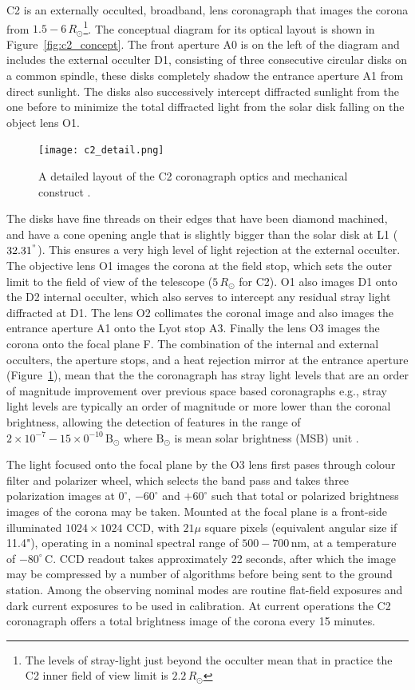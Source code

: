 C2 is an externally occulted, broadband, lens coronagraph that images the corona from $1.5-6\,R_{\odot}$\footnote{The levels of stray-light just beyond the occulter mean that in practice the C2 inner field of view limit is $2.2\,R_{\odot}$}. The conceptual diagram for its optical layout is shown in Figure~\ref{fig:c2_concept}. The front aperture A0 is on the left of the diagram and includes the external occulter D1, consisting of three consecutive circular disks on a common spindle, these disks completely shadow the entrance aperture A1 from direct sunlight. The disks also successively intercept diffracted sunlight from the one before to minimize the total diffracted light from the solar disk falling on the object lens O1. 
\begin{figure}[!t]
\begin{center}
\texttt{[image: c2\_detail.png]}
\caption[The LASCO C2 coronagraph detail]{A detailed layout of the C2 coronagraph optics and mechanical construct \citep{bru95}.}
\label{fig:c2_detail}
\end{center}
\end{figure}
The disks have fine threads on their edges that have been diamond machined, and have a cone opening angle that is slightly bigger than the solar disk at L1 ($32.31^"$). This ensures a very high level of light rejection at the external occulter. The objective lens O1 images the corona at the field stop, which sets the outer limit to the field of view of the telescope ($5\,R_{\odot}$ for C2). O1 also images D1 onto the D2 internal occulter, which also serves to intercept any residual stray light diffracted at D1. The lens O2 collimates the coronal image and also images the entrance aperture A1 onto the Lyot stop A3. Finally the lens O3 images the corona onto the focal plane F. The combination of the internal and external occulters, the aperture stops, and a heat rejection mirror at the entrance aperture (Figure~\ref{fig:c2_detail}), mean that the the coronagraph has stray light levels that are an order of magnitude improvement over previous space based coronagraphs e.g., stray light levels are typically an order of magnitude or more lower than the coronal brightness, allowing the detection of features in the range of $2\times10^{-7} - 15\times0^{-10}\,\mathrm{B}_{\odot}$ where $\mathrm{B}_{\odot}$ is mean solar brightness (MSB) unit \citep{bru95}.

The light focused onto the focal plane by the O3 lens first pases through colour filter and polarizer wheel, which selects the band pass and takes three polarization images at $0^{\circ}$, $-60^{\circ}$ and $+60^{\circ}$ such that total or polarized brightness images of the corona may be taken. Mounted at the focal plane is a front-side illuminated $1024\times1024$ CCD, with $21\mu$ square pixels (equivalent angular size if 11.4"),  operating in a nominal spectral range of $500-700$\,nm, at a temperature of $-80^{\circ}$\,C. CCD readout takes approximately 22 seconds, after which the image may be compressed by a number of algorithms before being sent to the ground station. Among the observing nominal modes are routine flat-field exposures and dark current exposures to be used in calibration. At current operations the C2 coronagraph offers a total brightness image of the corona every 15 minutes.  


